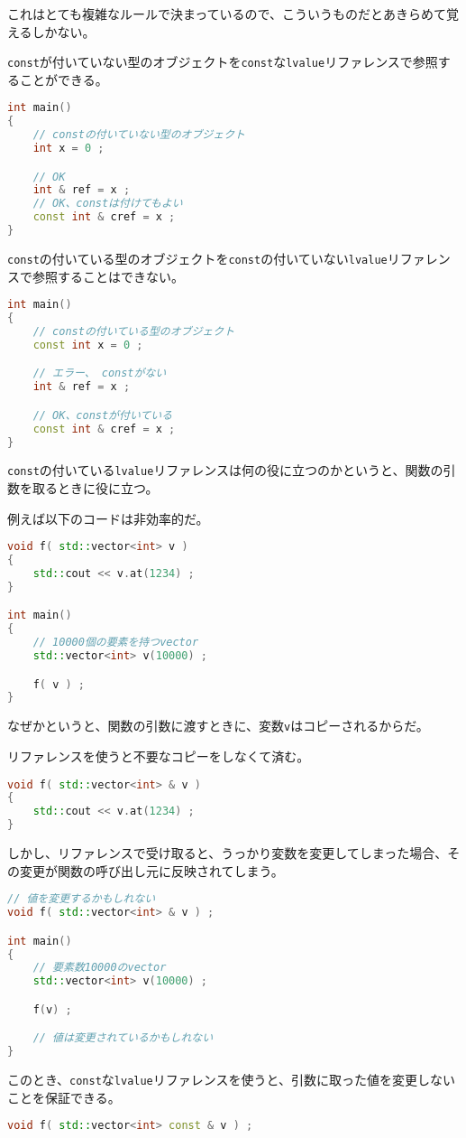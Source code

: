 これはとても複雑なルールで決まっているので、こういうものだとあきらめて覚えるしかない。

\texttt{const}が付いていない型のオブジェクトを\texttt{const}な\texttt{lvalue}リファレンスで参照することができる。

\ifTombow\pagebreak\fi
\begin{lstlisting}[language={C++}]
int main()
{
    // constの付いていない型のオブジェクト
    int x = 0 ;

    // OK
    int & ref = x ;
    // OK、constは付けてもよい
    const int & cref = x ;
}
\end{lstlisting}

\texttt{const}の付いている型のオブジェクトを\texttt{const}の付いていない\texttt{lvalue}リファレンスで参照することはできない。

\begin{lstlisting}[language={C++}]
int main()
{
    // constの付いている型のオブジェクト
    const int x = 0 ;

    // エラー、 constがない
    int & ref = x ;

    // OK、constが付いている
    const int & cref = x ;
}
\end{lstlisting}

\texttt{const}の付いている\texttt{lvalue}リファレンスは何の役に立つのかというと、関数の引数を取るときに役に立つ。

例えば以下のコードは非効率的だ。

\begin{lstlisting}[language={C++}]
void f( std::vector<int> v )
{
    std::cout << v.at(1234) ;
}

int main()
{
    // 10000個の要素を持つvector
    std::vector<int> v(10000) ;

    f( v ) ;
}
\end{lstlisting}

なぜかというと、関数の引数に渡すときに、変数\texttt{v}はコピーされるからだ。

リファレンスを使うと不要なコピーをしなくて済む。

\begin{lstlisting}[language={C++}]
void f( std::vector<int> & v )
{
    std::cout << v.at(1234) ;
}
\end{lstlisting}

しかし、リファレンスで受け取ると、うっかり変数を変更してしまった場合、その変更が関数の呼び出し元に反映されてしまう。

\begin{lstlisting}[language={C++}]
// 値を変更するかもしれない
void f( std::vector<int> & v ) ;

int main()
{
    // 要素数10000のvector
    std::vector<int> v(10000) ;

    f(v) ;

    // 値は変更されているかもしれない
}
\end{lstlisting}

このとき、\texttt{const}な\texttt{lvalue}リファレンスを使うと、引数に取った値を変更しないことを保証できる。

\begin{lstlisting}[language={C++}]
void f( std::vector<int> const & v ) ;
\end{lstlisting}


